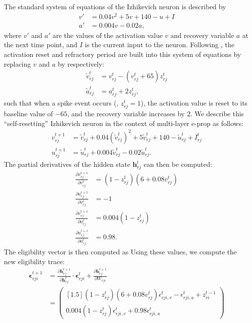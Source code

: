 			The standard system of equations of the Izhikevich neuron is described by
			\begin{align}
			v' &= 0.04v^2 + 5v + 140 - u + I\\
			a' &= 0.004v - 0.02a,
			\end{align}
			where $v'$ and $a'$ are the values of the activation value $v$ and recovery variable $a$ at the next time point, and $I$ is the current input to the neuron.
			Following \cite{traub2020learning}, the activation reset and refractory period are built into this system of equations by replacing $v$ and $a$ by respectively:
			\begin{align}
			\tilde{v}^t_{rj} &= v^t_{rj} - \left(v^t_{rj} + 65\right)z^t_{rj}\\
			\tilde{a}^t_{rj} &= a^t_{rj} + 2z^t_{rj},
			\end{align}
			such that when a spike event occurs (\ie, $z^t_{rj} = 1$), the activation value is reset to its baseline value of $-65$, and the recovery variable increases by 2.
			We describe this ``self-resetting'' Izhikevich neuron in the context of multi-layer e-prop as follows:
			\begin{align}
			v^{t+1}_{rj} &= \tilde{v}^t_{rj} + 0.04\left(\tilde{v}^t_{rj}\right)^2 + 5\tilde{v}^t_{rj} + 140 - \tilde{u}^t_{rj} + I^t_{rj}\\
			u^{t+1}_{rj} &= \tilde{u}^t_{rj} + 0.004\tilde{v}^t_{rj}-0.02\tilde{u}^t_{rj}.
			\end{align}
			The partial derivatives of the hidden state $\mathbf{h}^t_{rj}$ can then be computed:
			\begin{align}
			\frac{\partial v^{t+1}_{rj}}{\partial v^t_{rj}} &= \left(1-z^t_{rj}\right)\left(6+0.08v^t_{rj}\right)\\
			\frac{\partial a^{t+1}_{rj}}{\partial v^t_{rj}} &= -1\\
			\frac{\partial v^{t+1}_{rj}}{\partial a^t_{rj}} &= 0.004\left(1-z^t_{rj}\right)\\
			\frac{\partial a^{t+1}_{rj}}{\partial a^t_{rj}} &= 0.98.
			\end{align}
			The eligibility vector is then computed as
			Using these values, we compute the new eligibility trace:
	        \begin{align}
	        \mathbf{\epsilon}^{t+1}_{rji} &= \frac{\partial\mathbf{h}^{t+1}_{rj}}{\partial\mathbf{h}^t_{rj}}\cdot\mathbf{\epsilon}^t_{rji} + \frac{\partial\mathbf{h}^{t+1}_{rj}}{\partial W_{rji}}\\
	        &= \begin{pmatrix}[1.5]
	        \left(1-z^t_{rj}\right)\left(6+0.08v^t_{rj}\right)\epsilon^t_{rji, v} -\epsilon^t_{rji, a} + z_{ri}^{t-1}\\
	        0.004\left(1-z^t_{rj}\right)\epsilon^t_{rji, v} + 0.98\epsilon^t_{rji, a}
	        \end{pmatrix}\label{eq:ml_izhikevich_evector}
	        \end{align}
